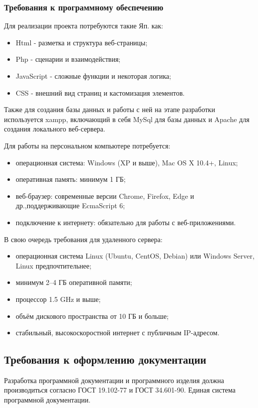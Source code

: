 \subsubsection{Требования к программному обеспечению}
Для реализации проекта потребуются такие Яп. как:
\begin{itemize}
	\item Html - разметка и структура веб-страницы;
	\item Php - сценарии и взаимодействия;
	\item JavaScript - сложные функции и некоторая логика;
	\item CSS - внешний вид страниц и кастомизация элементов.		
\end{itemize}

Также для создания базы данных и работы с ней на этапе разработки используется xampp, включающий в себя MySql для базы данных и Apache для создания локального веб-сервера. 

Для работы на персональном компьютере потребуется:
\begin{itemize}
	\item операционная система: Windows (XP и выше), Mac OS X 10.4+, Linux;
	\item оперативная память: минимум 1 ГБ;
	\item веб-браузер: современные версии Chrome, Firefox, Edge и др.,поддерживающие EcmaScript 6;
	\item подключение к интернету: обязательно для работы с веб-приложениями.		
\end{itemize}

В свою очередь требования для удаленного сервера:
\begin{itemize}
	\item операционная система Linux (Ubuntu, CentOS, Debian) или Windows Server, Linux предпочтительнее;
	\item минимум 2–4 ГБ оперативной памяти;
	\item процессор 1.5 GHz и выше;
	\item объём дискового пространства от 10 ГБ и больше;
	\item стабильный, высокоскоростной интернет с публичным IP-адресом.		
\end{itemize}
\subsection{Требования к оформлению документации}

Разработка программной документации и программного изделия должна производиться согласно ГОСТ 19.102-77 и ГОСТ 34.601-90. Единая система программной документации.